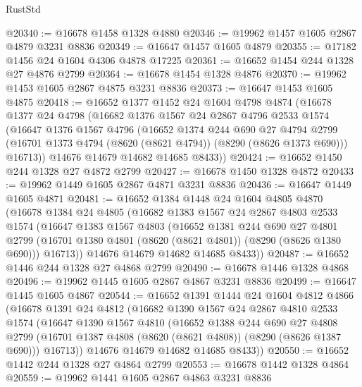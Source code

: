 \begin{lexlean}{RustStd}
\begin{coremodule}
@20340 := @16678 @1458 @1328 @4880
@20346 := @19962 @1457 @1605 @2867 @4879 @3231 @8836
@20349 := @16647 @1457 @1605 @4879
@20355 := @17182 @1456 @24 @1604 @4306 @4878 @17225
@20361 := @16652 @1454 @244 @1328 @27 @4876 @2799
@20364 := @16678 @1454 @1328 @4876
@20370 := @19962 @1453 @1605 @2867 @4875 @3231 @8836
@20373 := @16647 @1453 @1605 @4875
@20418 := @16652
    @1377
    @1452
    @24
    @1604
    @4798
    @4874
    (@16678
      @1377
      @24
      @4798
      (@16682
        @1376
        @1567
        @24
        @2867
        @4796
        @2533
        @1574
        (@16647
          @1376
          @1567
          @4796
          (@16652
            @1374
            @244
            @690
            @27
            @4794
            @2799
            (@16701 @1373 @4794 (@8620 (@8621 @4794)) (@8290 (@8626 @1373 @690)))
            @16713))
        @14676
        @14679
        @14682
        @14685
        @8433))
@20424 := @16652 @1450 @244 @1328 @27 @4872 @2799
@20427 := @16678 @1450 @1328 @4872
@20433 := @19962 @1449 @1605 @2867 @4871 @3231 @8836
@20436 := @16647 @1449 @1605 @4871
@20481 := @16652
    @1384
    @1448
    @24
    @1604
    @4805
    @4870
    (@16678
      @1384
      @24
      @4805
      (@16682
        @1383
        @1567
        @24
        @2867
        @4803
        @2533
        @1574
        (@16647
          @1383
          @1567
          @4803
          (@16652
            @1381
            @244
            @690
            @27
            @4801
            @2799
            (@16701 @1380 @4801 (@8620 (@8621 @4801)) (@8290 (@8626 @1380 @690)))
            @16713))
        @14676
        @14679
        @14682
        @14685
        @8433))
@20487 := @16652 @1446 @244 @1328 @27 @4868 @2799
@20490 := @16678 @1446 @1328 @4868
@20496 := @19962 @1445 @1605 @2867 @4867 @3231 @8836
@20499 := @16647 @1445 @1605 @4867
@20544 := @16652
    @1391
    @1444
    @24
    @1604
    @4812
    @4866
    (@16678
      @1391
      @24
      @4812
      (@16682
        @1390
        @1567
        @24
        @2867
        @4810
        @2533
        @1574
        (@16647
          @1390
          @1567
          @4810
          (@16652
            @1388
            @244
            @690
            @27
            @4808
            @2799
            (@16701 @1387 @4808 (@8620 (@8621 @4808)) (@8290 (@8626 @1387 @690)))
            @16713))
        @14676
        @14679
        @14682
        @14685
        @8433))
@20550 := @16652 @1442 @244 @1328 @27 @4864 @2799
@20553 := @16678 @1442 @1328 @4864
@20559 := @19962 @1441 @1605 @2867 @4863 @3231 @8836

\end{coremodule}
\end{lexlean}
